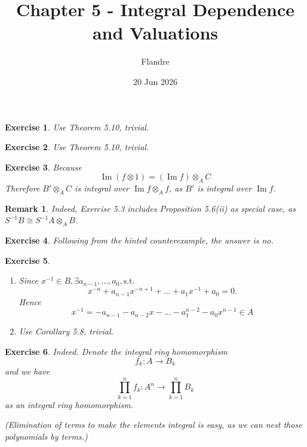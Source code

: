 \documentclass{article}
\title{Chapter 5 - Integral Dependence and Valuations}
\author{Flandre}
\date{20 Jun 2026}
\theoremstyle{breakstyle}
\newtheorem{exercise}{Exercise}[section]
\newtheorem{remark}{Remark}[section]
\DeclareMathOperator{\im}{Im}
\begin{document}
\maketitle

\setcounter{section}{5}
\begin{exercise}
    Use \emph{Theorem 5.10}, trivial.
\end{exercise}

\begin{exercise}
    Use \emph{Theorem 5.10}, trivial.
\end{exercise}

\begin{exercise}
    Because
    $$
    \im\left( f\otimes 1 \right) =\left( \im{f} \right)\otimes _{A}C 
    $$
    Therefore $B'\otimes _{A}C$ is integral over $\im{f}\otimes _{A}f$, as $B'$ is integral over $\im{f}$.
\end{exercise}

\begin{remark}
    Indeed, \emph{Exercise 5.3} includes \emph{Proposition 5.6(ii)} as special case, as $S^{-1}B\cong S^{-1}A\otimes _{A}B$.
\end{remark}

\begin{exercise}
    Following from the hinted counterexample, the answer is no.
\end{exercise}

\begin{exercise}
    \leavevmode \vspace{-\baselineskip}
    \begin{enumerate}[label=({\roman*})]
        \item 
            Since $x^{-1}\in B,\exists a_{n-1},\ldots ,a_0,\text{s.t. }$
            $$
            x^{-n}+a_{n-1}x^{-n+1}+\ldots +a_{1}x^{-1}+a_0=0
            .$$
            Hence
            $$
            x^{-1}=-a_{n-1}-a_{n-2}x-\ldots -a_1^{n-2}-a_0x^{n-1}\in A
            $$
        \item 
            Use \emph{Corollary 5.8}, trivial.
    \end{enumerate}
\end{exercise}

\begin{exercise}
    Indeed.
    Denote the integral ring homomorphism
    $$
    f_{k}:A\longrightarrow B_{k}
    $$
    and we have
    $$
    \prod_{k=1}^{n} f_{k}:A^{n}\longrightarrow \prod_{k=1}^{n} B_{k}
    $$
    as an integral ring homomorphism.

    (Elimination of terms to make the elements integral is easy, as we can nest
    those polynomials by terms.)
\end{exercise}
\end{document}
